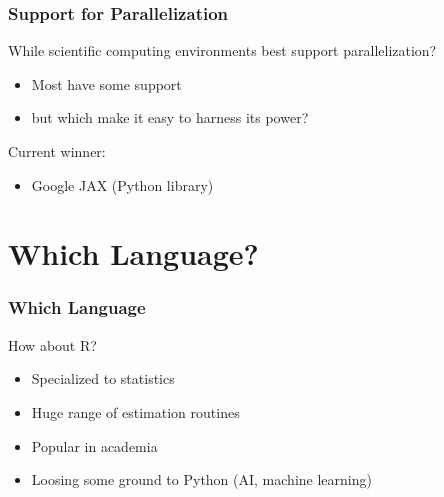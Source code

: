 \documentclass[
    xcolor={svgnames,dvipsnames},
    hyperref={colorlinks, citecolor=DeepPink4, linkcolor=DarkRed, urlcolor=DarkBlue}
    ]{beamer}  %
\newcommand{\1}{\mathbbm 1}
\begin{document}
\begin{frame}
    \frametitle{Support for Parallelization}
    
    While scientific computing environments best support parallelization?

        \vspace{0.5em}
        \vspace{0.5em}
    \begin{itemize}
        \item Most have some support
        \vspace{0.5em}
        \item but which make it easy to harness its power?
    \end{itemize}

    \vspace{0.5em}
    \vspace{0.5em}

    Current winner:
    \begin{itemize}
        \item Google JAX (Python library)
            \vspace{0.5em}
    \end{itemize}

\end{frame}




\section{Which Language?}


\begin{frame}
    \frametitle{Which Language}


    How about R?
    \vspace{0.5em}

    \begin{itemize}
        \item Specialized to statistics
            \vspace{0.5em}
        \item Huge range of estimation routines
            \vspace{0.5em}
        \item Popular in academia 
            \vspace{0.5em}
        \item Loosing some ground to Python (AI, machine learning)
    \end{itemize}

\end{frame}
\end{document}
